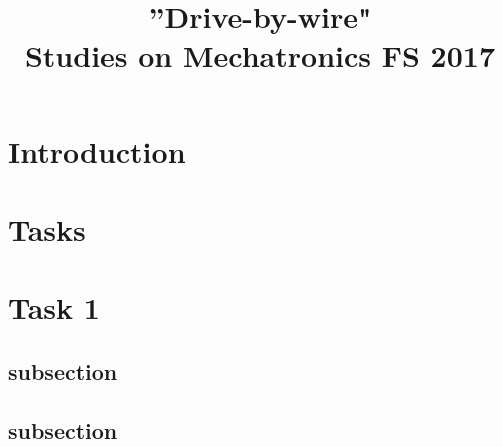 \documentclass[conference]{IEEEtran}
\begin{document}
\title{
''Drive-by-wire"
\\[0.5cm]
\large{Studies on Mechatronics FS 2017}
}

\author{
\and

}

\maketitle

\setlength\parindent{0pt}
\newcommand{\spn}[1]{\textsc{Span} \left\{ #1 \right\}}
\newcommand{\dimension}[1]{\textsc{dim} \left\{ #1 \right\}}
\newcommand{\real}[1]{\textsc{Re} \left( #1 \right)}
\newcommand{\imag}[1]{\textsc{Im} \left( #1 \right)}
\newcommand{\DET}[1]{\textsc{Det} \left[ #1 \right]}
\newcommand*\rfrac[2]{{}^{#1}\!/_{#2}}


\thispagestyle{plain}
\pagestyle{plain}



\section{Introduction}




\section{Tasks}


\section*{Task 1}



\subsection{subsection}


\subsection{subsection}
\end{document}
